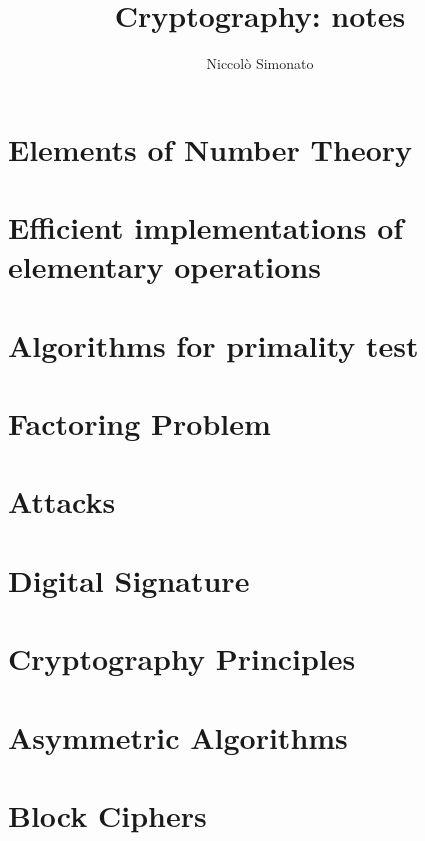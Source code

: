 \documentclass[12pt, a4paper, english]{report}
\author{Niccolò Simonato}
\title{Cryptography: notes}
\begin{document}
\maketitle

\tableofcontents

\chapter{Elements of Number Theory}


\chapter{Efficient implementations of elementary operations}


\chapter{Algorithms for primality test}


\chapter{Factoring Problem}


\chapter{Attacks}


\chapter{Digital Signature}


\chapter{Cryptography Principles}


\chapter{Asymmetric Algorithms}


\chapter{Block Ciphers}

\end{document}
